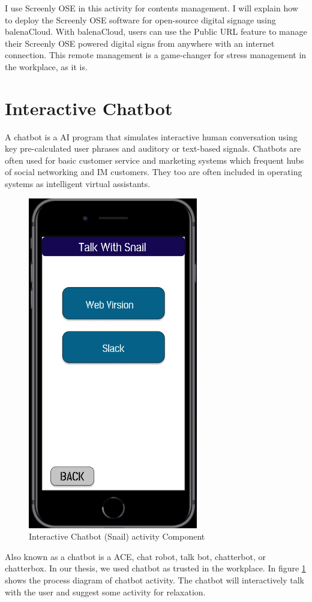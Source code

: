 I use Screenly OSE in this activity for contents management. I will explain how to deploy the Screenly OSE software for open-source digital signage using balenaCloud. With balenaCloud, users can use the Public URL feature to manage their Screenly OSE powered digital signs from anywhere with an internet connection. This remote management is a game-changer for stress management in the workplace, as it is.

\section{Interactive Chatbot}
A chatbot is a \acf{AI} program that simulates interactive human conversation using key pre-calculated user phrases and auditory or text-based signals. Chatbots are often used for basic customer service and marketing systems which frequent hubs of social networking and \acf{IM} customers. They too are often included in operating systems as intelligent virtual assistants.
\begin{figure}[hbt!] 
  \centering
  \includegraphics[width=0.4\linewidth]{chap4/image4/chat.png}
  \caption[Interactive Chatbot (Snail) activity Component ]{Interactive Chatbot (Snail) activity Component}
  \label{fig:chat}
\end{figure}

Also known as a chatbot is a \acf{ACE}, chat robot, talk bot, chatterbot, or chatterbox. In our thesis, we used chatbot as trusted in the workplace. In figure \ref{fig:chat} shows the process diagram of chatbot activity. The chatbot will interactively talk with the user and suggest some activity for relaxation. 


